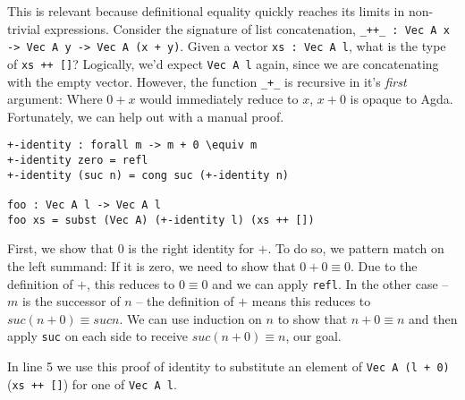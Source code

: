 This is relevant because definitional equality quickly reaches its limits in non-trivial expressions. Consider the signature of list concatenation, \texttt{\_++\_ : Vec A x -> Vec A y -> Vec A (x + y)}. Given a vector \texttt{xs : Vec A l}, what is the type of \texttt{xs ++ []}? Logically, we'd expect \texttt{Vec A l} again, since we are concatenating with the empty vector. However, the function \texttt{\_+\_} is recursive in it's \emph{first} argument: Where $0 + x$ would immediately reduce to $x$, $x + 0$ is opaque to Agda. Fortunately, we can help out with a manual proof.

\begin{lstlisting}[caption={Leveraging equality},label={lst:tutorial:using-equality},emph={identity,subst,foo}]
+-identity : forall m -> m + 0 \equiv m
+-identity zero = refl
+-identity (suc n) = cong suc (+-identity n)

foo : Vec A l -> Vec A l
foo xs = subst (Vec A) (+-identity l) (xs ++ [])
\end{lstlisting}

First, we show that $0$ is the right identity for $+$. To do so, we pattern match on the left summand: If it is zero, we need to show that $0 + 0 \equiv 0$. Due to the definition of $+$, this reduces to $0 \equiv 0$ and we can apply \texttt{refl}. In the other case -- $m$ is the successor of $n$ -- the definition of $+$ means this reduces to $suc (n + 0) \equiv suc n$. We can use induction on $n$ to show that $n + 0 \equiv n$ and then apply \texttt{suc} on each side to receive $suc (n + 0) \equiv n$, our goal.

In line 5 we use this proof of identity to substitute an element of \texttt{Vec A (l + 0)} (\texttt{xs ++ []}) for one of \texttt{Vec A l}.